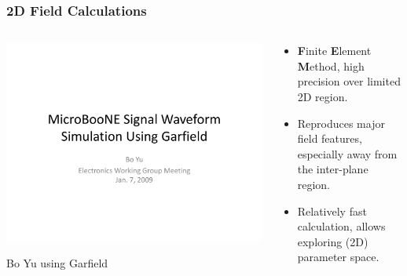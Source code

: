 \documentclass[xcolor=dvipsnames]{beamer}
\begin{document}
\begin{frame}
  \frametitle{2D Field Calculations}
  \begin{columns}
    \begin{column}{0.5\textwidth}
      \begin{center}
        \includegraphics[width=\textwidth,page=5,clip,trim=0 0 0 5mm]{GarfieldSimulation-BoYu.pdf}

        Bo Yu using Garfield
      \end{center}
    \end{column}
    \begin{column}{0.5\textwidth}
      \begin{itemize}
      \item \textbf{F}inite \textbf{E}lement \textbf{M}ethod, high
        precision over limited 2D region.
      \item Reproduces major field features, especially away from the inter-plane region.
      \item Relatively fast calculation, allows exploring (2D) parameter space.
      \end{itemize}
    \end{column}
  \end{columns}

\end{frame}
\end{document}
